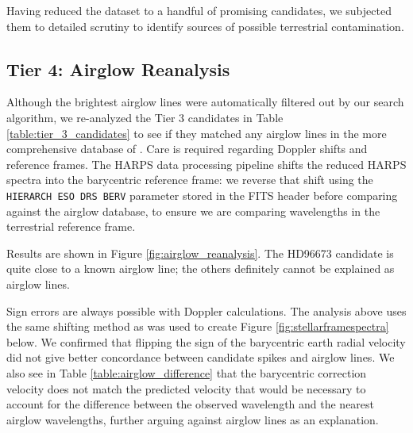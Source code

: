 \documentclass[twocolumn]{aastex701}
\begin{document}
Having reduced the dataset to a handful of promising candidates, we subjected them to detailed scrutiny to identify sources of possible terrestrial contamination.

\subsection{Tier 4: Airglow Reanalysis}
\label{s:airglow_reanalysis}

Although the brightest airglow lines were automatically filtered out by our search algorithm, we re-analyzed the Tier 3 candidates in Table \ref{table:tier_3_candidates} to see if they matched any airglow lines in the more comprehensive database of \cite{faint_airglow_database}.  Care is required regarding Doppler shifts and reference frames. The HARPS data processing pipeline shifts the reduced HARPS spectra into the barycentric reference frame: we reverse that shift using the \texttt{HIERARCH ESO DRS BERV} parameter stored in the FITS header before comparing against the airglow database, to ensure we are comparing wavelengths in the terrestrial reference frame.

Results are shown in Figure \ref{fig:airglow_reanalysis}. The HD96673 candidate is quite close to a known airglow line; the others definitely cannot be explained as airglow lines.

Sign errors are always possible with Doppler calculations.  The analysis above uses the same shifting method as was used to create Figure \ref{fig:stellarframespectra} below.  We confirmed that flipping the sign of the barycentric earth radial velocity did not give better concordance between candidate spikes and airglow lines. We also see in Table \ref{table:airglow_difference} that the barycentric correction velocity does not match the predicted velocity that would be necessary to account for the difference between the observed wavelength and the nearest airglow wavelengths, further arguing against airglow lines as an explanation.
\end{document}
